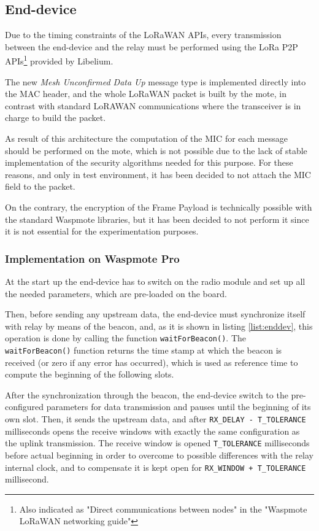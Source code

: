 \subsection{End-device}
\label{subsec:enddev}

Due to the timing constraints of the LoRaWAN APIs, every transmission between the end-device and the relay must be performed using the LoRa P2P APIs\footnote{Also indicated as "Direct communications between nodes" in the "Waspmote LoRaWAN networking guide"} provided by Libelium. \cite{waspmote}

The new \emph{Mesh Unconfirmed Data Up} message type is implemented directly into the MAC header, and the whole LoRaWAN packet is built by the mote, in contrast with standard LoRAWAN communications where the transceiver is in charge to build the packet.

As result of this architecture the computation of the MIC for each message should be performed on the mote, which is not possible due to the lack of stable implementation of the security algorithms needed for this purpose. For these reasons, and only in test environment, it has been decided to not attach the MIC field to the packet.

On the contrary, the encryption of the Frame Payload is technically possible with the standard Waspmote libraries, but it has been decided to not perform it since it is not essential for the experimentation purposes.


\subsubsection{Implementation on Waspmote Pro}
At the start up the end-device has to switch on the radio module and set up all the needed parameters, which are pre-loaded on the board.

Then, before sending any upstream data, the end-device must synchronize itself with relay by means of the beacon, and, as it is shown in listing \ref{list:enddev}, this operation is done by calling the function \texttt{waitForBeacon()}. The \texttt{waitForBeacon()} function returns the time stamp at which the beacon is received (or zero if any error has occurred), which is used as reference time to compute the beginning of the following slots.

After the synchronization through the beacon, the end-device switch to the pre-configured parameters for data transmission and pauses until the beginning of its own slot. Then, it sends the upstream data, and after \texttt{RX\_DELAY - T\_TOLERANCE} milliseconds opens the receive windows with exactly the same configuration as the uplink transmission. The receive window is opened 	\texttt{T\_TOLERANCE} milliseconds before actual beginning in order to overcome to possible differences with the relay internal clock, and to compensate it is kept open for \texttt{RX\_WINDOW + T\_TOLERANCE} millisecond.

